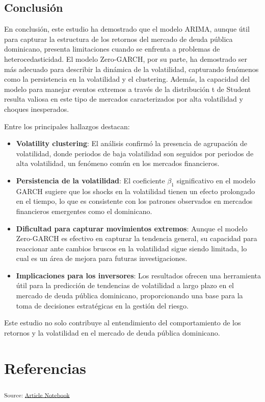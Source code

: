 \documentclass[
  number,
  preprint,
  3p,
  onecolumn]{elsarticle}
\begin{document}
\subsection{Conclusión}\label{conclusiuxf3n}

En conclusión, este estudio ha demostrado que el modelo ARIMA, aunque
útil para capturar la estructura de los retornos del mercado de deuda
pública dominicano, presenta limitaciones cuando se enfrenta a problemas
de heterocedasticidad. El modelo Zero-GARCH, por su parte, ha demostrado
ser más adecuado para describir la dinámica de la volatilidad,
capturando fenómenos como la persistencia en la volatilidad y el
clustering. Además, la capacidad del modelo para manejar eventos
extremos a través de la distribución t de Student resulta valiosa en
este tipo de mercados caracterizados por alta volatilidad y choques
inesperados.

Entre los principales hallazgos destacan:

\begin{itemize}
\item
  \textbf{Volatility clustering}: El análisis confirmó la presencia de
  agrupación de volatilidad, donde periodos de baja volatilidad son
  seguidos por periodos de alta volatilidad, un fenómeno común en los
  mercados financieros.
\item
  \textbf{Persistencia de la volatilidad}: El coeficiente \(\beta_1\)
  significativo en el modelo GARCH sugiere que los shocks en la
  volatilidad tienen un efecto prolongado en el tiempo, lo que es
  consistente con los patrones observados en mercados financieros
  emergentes como el dominicano.
\item
  \textbf{Dificultad para capturar movimientos extremos}: Aunque el
  modelo Zero-GARCH es efectivo en capturar la tendencia general, su
  capacidad para reaccionar ante cambios bruscos en la volatilidad sigue
  siendo limitada, lo cual es un área de mejora para futuras
  investigaciones.
\item
  \textbf{Implicaciones para los inversores}: Los resultados ofrecen una
  herramienta útil para la predicción de tendencias de volatilidad a
  largo plazo en el mercado de deuda pública dominicano, proporcionando
  una base para la toma de decisiones estratégicas en la gestión del
  riesgo.
\end{itemize}

Este estudio no solo contribuye al entendimiento del comportamiento de
los retornos y la volatilidad en el mercado de deuda pública dominicano.

\section{Referencias}\label{referencias}

\textsubscript{Source:
\href{https://iancont.github.io/fixed_income_garch/index-preview.html}{Article
Notebook}}


  
\end{document}
